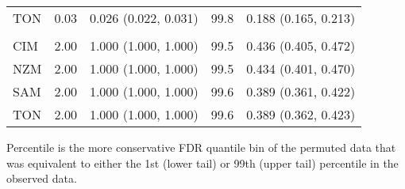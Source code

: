 \documentclass[]{report}
\begin{document}
\begin{table}
\begin{threeparttable}
\begin{tabular}[t]{lrlrl}
\hspace{1em}TON & 0.03 & 0.026 (0.022, 0.031) & 99.8 & 0.188 (0.165, 0.213)\\
\addlinespace[0.3em]
\multicolumn{5}{l}{\textbf{Zeng's E}}\\
\hspace{1em}CIM & 2.00 & 1.000 (1.000, 1.000) & 99.5 & 0.436 (0.405, 0.472)\\
\hspace{1em}NZM & 2.00 & 1.000 (1.000, 1.000) & 99.5 & 0.434 (0.401, 0.470)\\
\hspace{1em}SAM & 2.00 & 1.000 (1.000, 1.000) & 99.6 & 0.389 (0.361, 0.422)\\
\hspace{1em}TON & 2.00 & 1.000 (1.000, 1.000) & 99.6 & 0.389 (0.362, 0.423)\\
\bottomrule
\end{tabular}
\begin{tablenotes}
\item Percentile is the more conservative FDR quantile bin of the permuted data that was equivalent to either the 1st (lower tail) or 99th (upper tail) percentile in the observed data.
\end{tablenotes}
\end{threeparttable}
\end{table}
\end{document}
